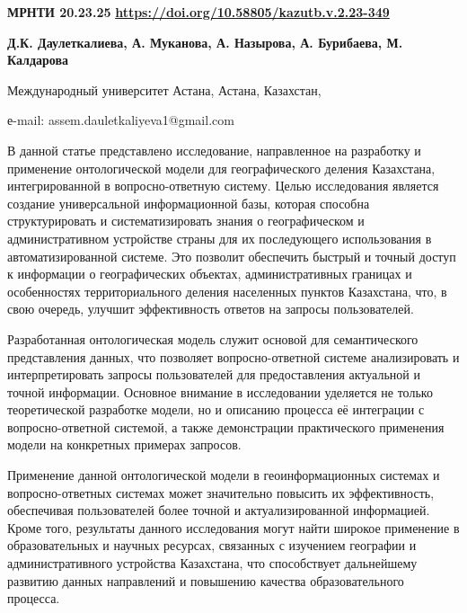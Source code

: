 \newpage
{\bfseries МРНТИ 20.23.25}
\hfill {\bfseries \href{https://doi.org/10.58805/kazutb.v.2.23-349}{https://doi.org/10.58805/kazutb.v.2.23-349}}


\begin{center}
{\bfseries Д.К. Даулеткалиева\envelope, А. Муканова, А. Назырова, А. Бурибаева, М. Калдарова}

Международный университет Астана, Астана, Казахстан,

е-mail: assem.dauletkaliyeva1@gmail.com
\end{center}

В данной статье представлено исследование, направленное на разработку и
применение онтологической модели для географического деления Казахстана,
интегрированной в вопросно-ответную систему. Целью исследования является
создание универсальной информационной базы, которая способна
структурировать и систематизировать знания о географическом и
административном устройстве страны для их последующего использования в
автоматизированной системе. Это позволит обеспечить быстрый и точный
доступ к информации о географических объектах, административных границах
и особенностях территориального деления населенных пунктов Казахстана,
что, в свою очередь, улучшит эффективность ответов на запросы
пользователей.

Разработанная онтологическая модель служит основой для семантического
представления данных, что позволяет вопросно-ответной системе
анализировать и интерпретировать запросы пользователей для
предоставления актуальной и точной информации. Основное внимание в
исследовании уделяется не только теоретической разработке модели, но и
описанию процесса её интеграции с вопросно-ответной системой, а также
демонстрации практического применения модели на конкретных примерах
запросов.

Применение данной онтологической модели в геоинформационных системах и
вопросно-ответных системах может значительно повысить их эффективность,
обеспечивая пользователей более точной и актуализированной информацией.
Кроме того, результаты данного исследования могут найти широкое
применение в образовательных и научных ресурсах, связанных с изучением
географии и административного устройства Казахстана, что способствует
дальнейшему развитию данных направлений и повышению качества
образовательного процесса.

